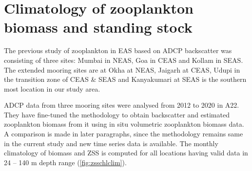 \documentclass{article}
\begin{document}
	 
	\section{Climatology of zooplankton biomass and standing stock}
	The previous study of zooplankton in EAS based on ADCP backscatter was consisting of three sites: Mumbai in NEAS, Goa in CEAS and Kollam in SEAS. The extended mooring sites are at Okha at NEAS, Jaigarh at CEAS, Udupi in the transition zone of CEAS \& SEAS and Kanyakumari at SEAS is the southern most location in our study area. 

	ADCP data from three mooring sites were analysed from 2012 to 2020 in A22. They have fine-tuned the methodology to obtain backscatter and estimated zooplankton biomass from it using in situ volumetric zooplankton biomass data. A comparison is made in later paragraphs, since the methodology remains same in the current study and new time series data is available. The monthly climatology of biomass and ZSS is computed for all locations having valid data in 24 -- 140 m depth range (\cref{fig:zsschlclim}).
	 
\end{document}
